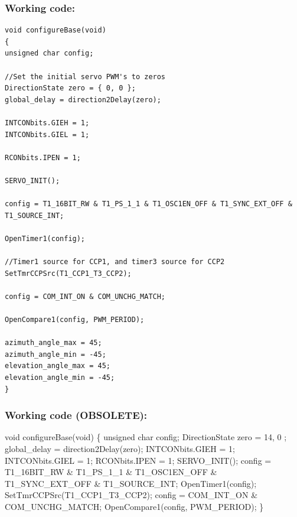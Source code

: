 \documentclass[]{report}
\begin{document}
\subsubsection{Working code:}
\begin{lstlisting}
void configureBase(void)
{
unsigned char config;

//Set the initial servo PWM's to zeros
DirectionState zero = { 0, 0 };
global_delay = direction2Delay(zero);

INTCONbits.GIEH = 1;
INTCONbits.GIEL = 1;

RCONbits.IPEN = 1;

SERVO_INIT();

config = T1_16BIT_RW & T1_PS_1_1 & T1_OSC1EN_OFF & T1_SYNC_EXT_OFF & T1_SOURCE_INT;

OpenTimer1(config);

//Timer1 source for CCP1, and timer3 source for CCP2
SetTmrCCPSrc(T1_CCP1_T3_CCP2);

config = COM_INT_ON & COM_UNCHG_MATCH;

OpenCompare1(config, PWM_PERIOD);

azimuth_angle_max = 45;
azimuth_angle_min = -45;
elevation_angle_max = 45;
elevation_angle_min = -45;
}
\end{lstlisting}

\subsubsection{Working code (OBSOLETE):}
void configureBase(void) \newline
\{ \newline
unsigned char config; \newline
DirectionState zero = { 14, 0 }; \newline
global\_delay = direction2Delay(zero);\newline
INTCONbits.GIEH = 1;\newline
INTCONbits.GIEL = 1;\newline
RCONbits.IPEN = 1;\newline
SERVO\_INIT();\newline
config = T1\_16BIT\_RW \& T1\_PS\_1\_1 \& T1\_OSC1EN\_OFF \& T1\_SYNC\_EXT\_OFF \& T1\_SOURCE\_INT; \newline
OpenTimer1(config);\newline
SetTmrCCPSrc(T1\_CCP1\_T3\_CCP2);\newline
config = COM\_INT\_ON \& COM\_UNCHG\_MATCH;\newline
OpenCompare1(config, PWM\_PERIOD);\newline
\}
\end{document}
